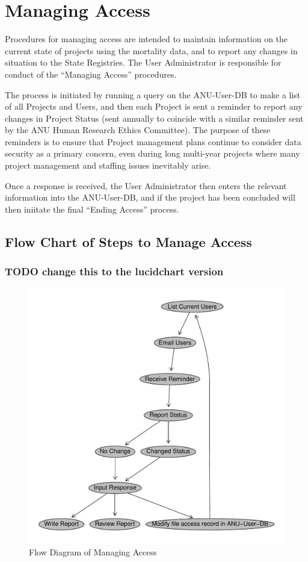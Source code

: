 \documentclass[a4paper]{article}
\begin{document}
\section{Managing Access}
\label{sec-4}

Procedures for managing access are intended to maintain information on the current state of projects using the mortality data, and to report any changes in situation to the State Registries. The User Administrator is responsible for conduct of the ``Managing Access'' procedures.

The process is initiated by running a query on the ANU-User-DB to make a list of all Projects and Users, and then each Project is sent a reminder to report any changes in Project Status (sent annually to coincide with a similar reminder sent by the ANU Human Research Ethics Committee). The purpose of these reminders is to ensure that Project management plans continue to consider data security as a primary concern, even during long multi-year projects where many project management and staffing issues inevitably arise.

Once a response is received, the User Administrator then enters the relevant information into the ANU-User-DB, and if the project has been concluded will then iniitate the final ``Ending Access'' process.
\subsection{Flow Chart of Steps to Manage Access}
\label{sec-4-1}
\subsubsection{\textbf{TODO} change this to the lucidchart version}
\label{sec-4-1-1}

\begin{figure}[!h]
\centering
\includegraphics[width=\textwidth]{DataAccessFlowDiagram-ManagingAccess.pdf}
\caption{Flow Diagram of Managing Access}
\label{fig:DataAccessFlowDiagram-ManagingAccess}
\end{figure}
\clearpage
\end{document}
